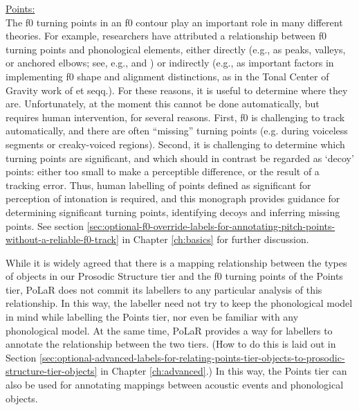 \uline{Points:}\\ The f0 turning points in an f0 contour play an important role in many different theories.  For example, researchers have attributed a relationship between f0 turning points and phonological elements, either directly (e.g., as peaks, valleys, or anchored elbows; see, e.g., \citealt{ladd-99} and \citealt{welby06}) or indirectly (e.g., as important factors in implementing f0 shape and alignment distinctions, as in the Tonal Center of Gravity work of \citealt{barnes-12} et seqq.). For these reasons, it is useful to determine where they are.  Unfortunately, at the moment this cannot be done automatically, but requires human intervention, for several reasons.  First, f0 is challenging to track automatically, and there are often “missing” turning points (e.g. during voiceless segments or creaky-voiced regions).  Second, it is challenging to determine which turning points are significant, and which should in contrast be regarded as ‘decoy’ points: either too small to make a perceptible difference, or the result of a tracking error.  Thus, human labelling of points defined as significant for perception of intonation is required, and this monograph provides guidance for determining significant turning points, identifying decoys and inferring missing points.  See section \ref{sec:optional-f0-override-labels-for-annotating-pitch-points-without-a-reliable-f0-track} in Chapter \ref{ch:basics} for further discussion.

While it is widely agreed that there is a mapping relationship between the types of objects in our Prosodic Structure tier and the f0 turning points of the Points tier, PoLaR does not commit its labellers to any particular analysis of this relationship. In this way, the labeller need not try to keep the phonological model in mind while labelling the Points tier, nor even be familiar with any phonological model. At the same time, PoLaR provides a way for labellers to annotate the relationship between the two tiers. (How to do this is laid out in Section \ref{sec:optional-advanced-labels-for-relating-points-tier-objects-to-prosodic-structure-tier-objects} in Chapter \ref{ch:advanced}.) In this way, the Points tier can also be used for annotating mappings between acoustic events and phonological objects.

